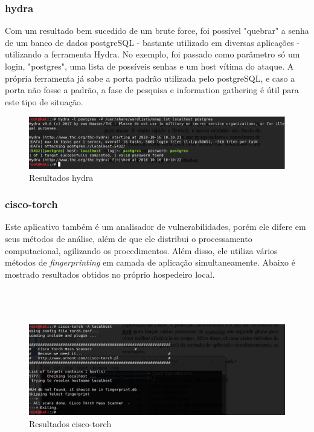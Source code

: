 \documentclass[journal]{IEEEtran}
\begin{document}
\subsubsection{hydra}
Com um resultado bem sucedido de um brute force, foi possível "quebrar" a senha de um banco de dados postgreSQL - bastante utilizado em diversas aplicações - utilizando a ferramenta Hydra. No exemplo, foi passado como parâmetro só um login, "postgres", uma lista de possíveis senhas e um host vítima do ataque. A própria ferramenta já sabe a porta padrão utilizada pelo postgreSQL, e caso a porta não fosse a padrão, a fase de pesquisa e information gathering é útil para este tipo de situação.


\begin{figure}[h!]
	\includegraphics[width=\linewidth]{../hydraPostgresLocalhost.png}
	\caption{Resultados hydra}
	\label{fig:hydra_results}
\end{figure}

\subsubsection{cisco-torch}
Este aplicativo também é um analisador de vulnerabilidades, porém ele difere em seus métodos de análise, além de que ele distribui o processamento computacional, agilizando os procedimentos. Além disso, ele utiliza vários métodos de \textit{fingerprinting} em camada de aplicação simultaneamente. Abaixo é mostrado resultados obtidos no próprio hospedeiro local.
\\
\\
\\
\\

\begin{figure}[h!]
	\includegraphics[width=\linewidth]{../simpleCiscoTorchLocalhost.png}
	\caption{Resultados cisco-torch}
	\label{fig:cisco_torch_results}
\end{figure}
\end{document}

